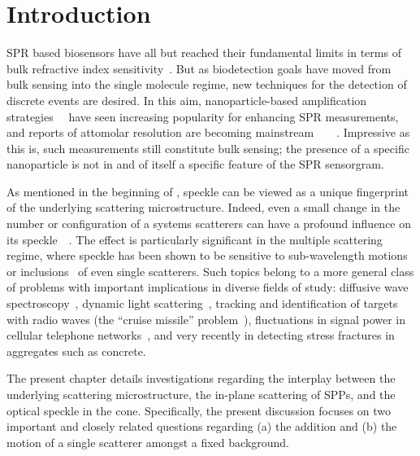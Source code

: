 \section{Introduction}
SPR based biosensors have all but reached their fundamental limits in terms of
bulk refractive index sensitivity~\cite{piliarik2009surface}.  But as
biodetection goals have moved from bulk sensing into the single molecule
regime, new techniques for the detection of discrete events are desired.  In
this aim, nanoparticle-based amplification
strategies~\cite{wang2005nanomaterial}~\cite{jain2007review} have seen
increasing popularity for enhancing SPR measurements, and reports of attomolar
resolution are becoming
mainstream~\cite{fang2006attomole}~\cite{krishnan2011attomolar}~\cite{kwon2012nanoparticle}~\cite{sim2010attomolar}.
Impressive as this is, such measurements still constitute bulk sensing; the
presence of a specific nanoparticle is not in and of itself a specific feature
of the SPR sensorgram.

As mentioned in the beginning of , speckle can be viewed
as a unique fingerprint~\cite{ravikanth2001physical} of the underlying
scattering microstructure.  Indeed, even a small change in the number or
configuration of a systems scatterers can have a profound influence on its
speckle~\cite{berkovits1994correlations}~\cite{feng1986sensitivity}.  The
effect is particularly significant in the multiple scattering regime, where
speckle has been shown to be sensitive to sub-wavelength
motions~\cite{berkovits1991sensitivity} or
inclusions~\cite{berkovits1990theory} of even single scatterers.  Such topics
belong to a more general class of problems with important implications in
diverse fields of study: diffusive wave spectroscopy~\cite{pine1988diffusing},
dynamic light scattering~\cite{berne2000dynamic}, tracking and identification
of targets with radio waves (the ``cruise missile''
problem~\cite{atkins1991neural}), fluctuations in signal power in cellular
telephone networks~\cite{abdi2001estimation}, and very recently in detecting
stress fractures in aggregates such as concrete.

The present chapter details investigations regarding the interplay between the
underlying scattering microstructure, the in-plane scattering of SPPs, and the
optical speckle in the cone.  Specifically, the present discussion focuses on
two important and closely related questions regarding (a) the addition and (b)
the motion of a single scatterer amongst a fixed background.
